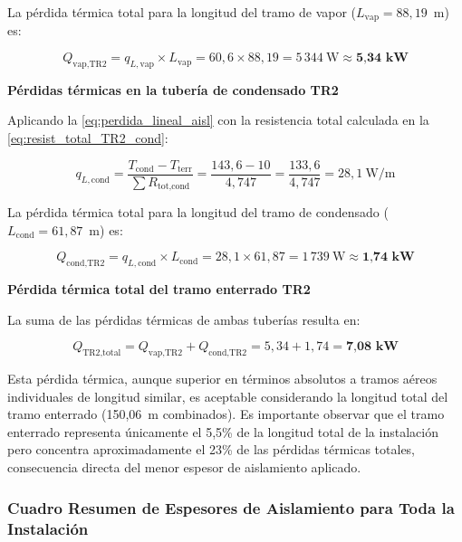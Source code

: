\documentclass[12pt]{article}
\begin{document}
La pérdida térmica total para la longitud del tramo de vapor ($L_{\text{vap}} = 88{,}19$~m) es:

\begin{equation}
	Q_{\text{vap,TR2}} = q_{L,\text{vap}} \times L_{\text{vap}} = 60{,}6 \times 88{,}19 = 5\,344~\text{W} \approx \textbf{5{,}34~kW}
	\label{eq:perdida_total_TR2_vap}
\end{equation}

\textbf{Pérdidas térmicas en la tubería de condensado TR2}

Aplicando la \eqref{eq:perdida_lineal_aisl} con la resistencia total calculada en la \eqref{eq:resist_total_TR2_cond}:

\begin{equation}
	q_{L,\text{cond}} = \frac{T_{\text{cond}} - T_{\text{terr}}}{\sum R_{\text{tot,cond}}} = \frac{143{,}6 - 10}{4{,}747} = \frac{133{,}6}{4{,}747} = 28{,}1~\text{W/m}
	\label{eq:perdida_lineal_TR2_cond}
\end{equation}

La pérdida térmica total para la longitud del tramo de condensado ($L_{\text{cond}} = 61{,}87$~m) es:

\begin{equation}
	Q_{\text{cond,TR2}} = q_{L,\text{cond}} \times L_{\text{cond}} = 28{,}1 \times 61{,}87 = 1\,739~\text{W} \approx \textbf{1{,}74~kW}
	\label{eq:perdida_total_TR2_cond}
\end{equation}

\textbf{Pérdida térmica total del tramo enterrado TR2}

La suma de las pérdidas térmicas de ambas tuberías resulta en:

\begin{equation}
	Q_{\text{TR2,total}} = Q_{\text{vap,TR2}} + Q_{\text{cond,TR2}} = 5{,}34 + 1{,}74 = \textbf{7{,}08~kW}
	\label{eq:perdida_total_TR2}
\end{equation}

Esta pérdida térmica, aunque superior en términos absolutos a tramos aéreos individuales de longitud similar, es aceptable considerando la longitud total del tramo enterrado (150{,}06~m combinados). Es importante observar que el tramo enterrado representa únicamente el 5{,}5\% de la longitud total de la instalación pero concentra aproximadamente el 23\% de las pérdidas térmicas totales, consecuencia directa del menor espesor de aislamiento aplicado.


\subsubsection{Cuadro Resumen de Espesores de Aislamiento para Toda la Instalación}
\label{subsubsec:resumen_aislamiento}
\end{document}
